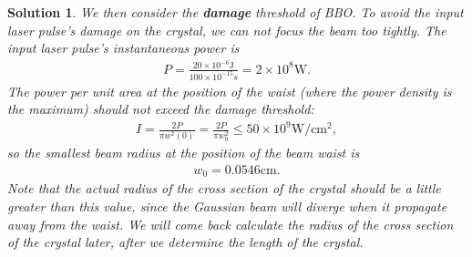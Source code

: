 \documentclass[UTF8,10pt,a4paper]{article}
\theoremstyle{Problem}
\theoremstyle{Solution}
\newtheorem*{sol}{Solution}
\begin{document}
\begin{sol}
    We then consider the \textbf{damage} threshold of BBO. To avoid the input laser pulse's damage on the crystal, we can not focus the beam too tightly. The input laser pulse's instantaneous power is
    \begin{align}
        P=\frac{20\times 10^{-6}\text{J}}{100\times 10^{-15}s}=2\times 10^8\text{W}.
    \end{align}
    The power per unit area at the position of the waist (where the power density is the maximum) should not exceed the damage threshold:
    \begin{align}
        I=\frac{2P}{\pi w^2(0)}=\frac{2P}{\pi w_0^2}\leq 50\times 10^9\text{W}/\text{cm}^2,
    \end{align}
    so the smallest beam radius at the position of the beam waist is
    \begin{align}
        w_0=0.0546\text{cm}.
    \end{align}
    Note that the actual radius of the cross section of the crystal should be a little greater than this value, since the Gaussian beam will diverge when it propagate away from the waist. We will come back calculate the radius of the cross section of the crystal later, after we determine the length of the crystal.


\end{sol}
\end{document}
